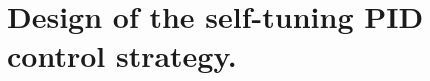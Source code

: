 \documentclass{beamer}
\begin{document}

\section{Design of the self-tuning PID control strategy.}

   

\end{document}
